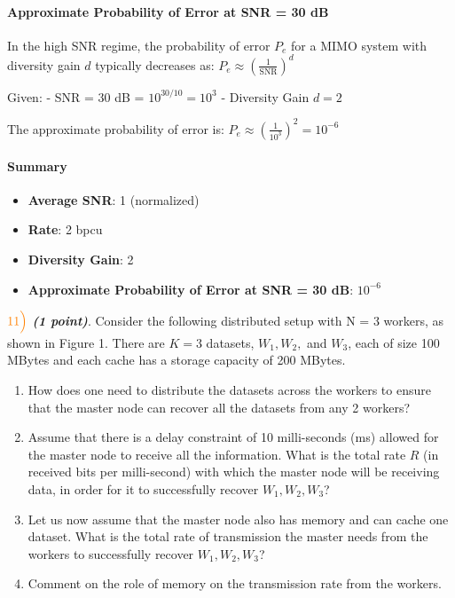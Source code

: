 \documentclass[11pt]{article}
\providecommand{\tightlist}{%
      \setlength{\itemsep}{0pt}\setlength{\parskip}{0pt}}
\begin{document}
\paragraph{Approximate Probability of Error at SNR = 30
dB}\label{approximate-probability-of-error-at-snr-30-db}

In the high SNR regime, the probability of error \(P_e\) for a MIMO
system with diversity gain \(d\) typically decreases as:
\(P_e \approx \left( \frac{1}{\text{SNR}} \right)^d\)

Given: - SNR = 30 dB = \(10^{30/10} = 10^3\) - Diversity Gain \(d = 2\)

The approximate probability of error is:
\(P_e \approx \left( \frac{1}{10^3} \right)^2 = 10^{-6}\)

\paragraph{Summary}\label{summary}

\begin{itemize}
\tightlist
\item
  \textbf{Average SNR}: 1 (normalized)
\item
  \textbf{Rate}: 2 bpcu
\item
  \textbf{Diversity Gain}: 2
\item
  \textbf{Approximate Probability of Error at SNR = 30 dB}: \(10^{-6}\)
\end{itemize}

    \(\color{orange}11\Bigl)\) \textbf{\emph{(1 point)}}. Consider the
following distributed setup with N = 3 workers, as shown in Figure 1.
There are \(K = 3\) datasets, \(W_1, W_2,\) and \(W_3\), each of size
100 MBytes and each cache has a storage capacity of 200 MBytes.

\begin{enumerate}
\def\labelenumi{\alph{enumi})}
\item
  How does one need to distribute the datasets across the workers to
  ensure that the master node can recover all the datasets from any 2
  workers?
\item
  Assume that there is a delay constraint of 10 milli-seconds (ms)
  allowed for the master node to receive all the information. What is
  the total rate \(R\) (in received bits per milli-second) with which
  the master node will be receiving data, in order for it to
  successfully recover \(W_1, W_2, W_3\)?
\item
  Let us now assume that the master node also has memory and can cache
  one dataset. What is the total rate of transmission the master needs
  from the workers to successfully recover \(W_1, W_2, W_3\)?
\item
  Comment on the role of memory on the transmission rate from the
  workers.
\end{enumerate}
\end{document}
